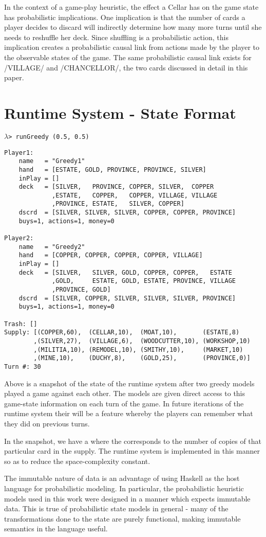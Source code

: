 In the context of a game-play heuristic, the effect a Cellar has on the game state
has probabilistic implications. One implication is that the number of cards a
player decides to discard will indirectly determine how many more turns until
she needs to reshuffle her deck. Since shuffling is a probabilistic action, this
implication creates a probabilistic causal link from actions made by the player
to the observable states of the game.
The same probabilistic causal link exists for \hsk/VILLAGE/ and \hsk/CHANCELLOR/,
the two cards discussed in detail in this paper.

\section{Runtime System - State Format}
\begin{small}
$\lambda$\verb|> runGreedy (0.5, 0.5)|
\end{small}
\begin{Verbatim}[fontsize=\small]
Player1:
    name   = "Greedy1"
    hand   = [ESTATE, GOLD, PROVINCE, PROVINCE, SILVER]
    inPlay = []
    deck   = [SILVER,   PROVINCE, COPPER, SILVER,  COPPER
             ,ESTATE,   COPPER,   COPPER, VILLAGE, VILLAGE
             ,PROVINCE, ESTATE,   SILVER, COPPER]
    dscrd  = [SILVER, SILVER, SILVER, COPPER, COPPER, PROVINCE]
    buys=1, actions=1, money=0

Player2:
    name   = "Greedy2"
    hand   = [COPPER, COPPER, COPPER, COPPER, VILLAGE]
    inPlay = []
    deck   = [SILVER,   SILVER, GOLD, COPPER, COPPER,   ESTATE
             ,GOLD,     ESTATE, GOLD, ESTATE, PROVINCE, VILLAGE
             ,PROVINCE, GOLD]
    dscrd  = [SILVER, COPPER, SILVER, SILVER, SILVER, PROVINCE]
    buys=1, actions=1, money=0

Trash: []
Supply: [(COPPER,60),  (CELLAR,10),  (MOAT,10),       (ESTATE,8)
        ,(SILVER,27),  (VILLAGE,6),  (WOODCUTTER,10), (WORKSHOP,10)
        ,(MILITIA,10), (REMODEL,10), (SMITHY,10),     (MARKET,10)
        ,(MINE,10),    (DUCHY,8),    (GOLD,25),       (PROVINCE,0)]
Turn #: 30
\end{Verbatim}

Above is a snapshot of the state of the runtime system after two
greedy models played a game against each other.
The models are given direct access to this game-state information
on each turn of the game. In future iterations of the runtime system
their will be a feature whereby the players can remember what
they did on previous turns.

In the snapshot, we have a  where
the  corresponds to the number of copies of
that particular card in the supply. The runtime system is implemented in
this manner so as to reduce the space-complexity constant.

The immutable nature of data is an advantage of using Haskell as the
host language for probabilistic modeling. In particular, the probabilistic
heuristic models used in this work were designed in a manner which expects
immutable data. This is true of probabilistic state models in general - many
of the transformations done to the state are purely functional, making
immutable semantics in the language useful.

